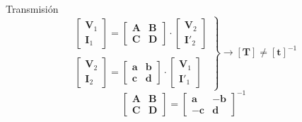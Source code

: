\documentclass[aspectratio=169, usenames,svgnames,dvipsnames]{beamer}
\begin{document}
\begin{frame}[label={sec:orgda1acba}]{Transmisión}
\[
  \left.
    \begin{array}{l}
  \left[
    \begin{array}{c}
      \mathbf{V}_1\\
      \mathbf{I}_1
    \end{array}
  \right] =
  \left[
    \begin{array}{cc}
      \mathbf{A} & \mathbf{B}\\
      \mathbf{C} & \mathbf{D}
    \end{array}
  \right] \cdot
  \left[
    \begin{array}{c}
      \mathbf{V}_2\\
      \mathbf{I'}_2
    \end{array}
  \right]
      \\ \\
  \left[
    \begin{array}{c}
      \mathbf{V}_2\\
      \mathbf{I}_2
    \end{array}
  \right] =
  \left[
    \begin{array}{cc}
      \mathbf{a} & \mathbf{b}\\
      \mathbf{c} & \mathbf{d}
    \end{array}
  \right] \cdot
  \left[
    \begin{array}{c}
      \mathbf{V}_1\\
      \mathbf{I'}_1
    \end{array}
  \right]
      \end{array}
    \right\}
    \rightarrow
    \boxed{[\mathbf{T}] \neq [\mathbf{t}]^{-1}}
  \]
\[
  \boxed{
    \left[
      \begin{array}{cc}
        \mathbf{A} & \mathbf{B}\\
        \mathbf{C} & \mathbf{D}
      \end{array}\right] = 
      \left[
      \begin{array}{cc}
        \mathbf{a} & \mathbf{-b}\\
        \mathbf{-c} & \mathbf{d}
      \end{array}
      \right]^{-1}
    }
\]
\end{frame}
\end{document}
